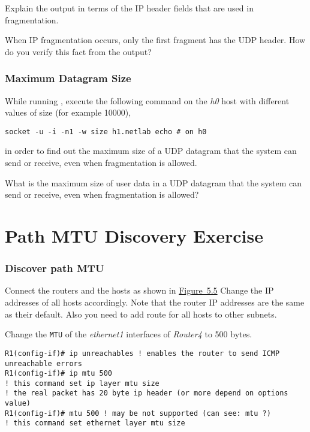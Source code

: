 \documentclass{../UTNetLab}
\begin{document}
\begin{report}
    \item Explain the  output in terms of the IP header fields that are used in fragmentation.

    \item When IP fragmentation occurs, only the first fragment has the UDP header.
    How do you verify this fact from the  output?
\end{report}


\section{Maximum Datagram Size}
\label{sec:MaxDatagramSize}
While running , execute the following command on the \textit{h0} host with different values of size (for example 10000),
\begin{lstlisting}[emph={size, h1,netlab},morekeywords={[3]echo}]
socket -u -i -n1 -w size h1.netlab echo # on h0
\end{lstlisting}
in order to find out the maximum size of a UDP datagram that the system can send or receive, even when fragmentation is allowed.

\begin{report}
    \item What is the maximum size of user data in a UDP datagram that the system can send or receive, even when fragmentation is allowed?
\end{report}


\part{Path MTU Discovery Exercise}\label{sec:PMTUD}

\section{Discover path MTU}
Connect the routers and the hosts as shown in \hyperref[fig:5.5]{Figure~5.5} Change the IP addresses of all hosts accordingly.
Note that the router IP addresses are the same as their default.
Also you need to add route for all hosts to other subnets.


Change the \texttt{MTU} of the \textit{ethernet1} interfaces of \textit{Router4} to 500 bytes.
\begin{lstlisting}[language={cisco}]
R1(config-if)# ip unreachables ! enables the router to send ICMP unreachable errors
R1(config-if)# ip mtu 500
! this command set ip layer mtu size
! the real packet has 20 byte ip header (or more depend on options value)
R1(config-if)# mtu 500 ! may be not supported (can see: mtu ?)
! this command set ethernet layer mtu size
    \end{lstlisting}
\end{document}
